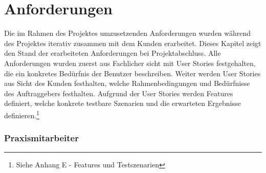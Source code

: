 \section{Anforderungen}\label{sec:anforderungen}

Die im Rahmen des Projektes umzusetzenden Anforderungen wurden während des Projektes iterativ zusammen mit dem Kunden erarbeitet.
Dieses Kapitel zeigt den Stand der erarbeiteten Anforderungen bei Projektabschluss.
Alle Anforderungen wurden zuerst aus Fachlicher sicht mit User Stories festgehalten, die ein konkretes Bedürfnis der Benutzer beschreiben.
Weiter werden User Stories aus Sicht des Kunden festhalten, welche Rahmenbedingungen und Bedürfnisse des Auftraggebers festhalten.
Aufgrund der User Stories werden Features definiert, welche konkrete testbare Szenarien und die erwarteten Ergebnisse definieren.\footnote{Siehe Anhang E - Features und Testszenarien}

\subsubsection*{Praxismitarbeiter}

